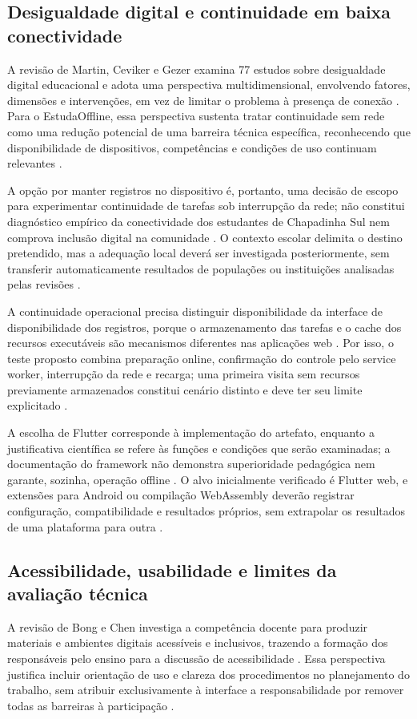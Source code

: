 \subsection{Desigualdade digital e continuidade em baixa conectividade}
A revisão de Martin, Ceviker e Gezer examina 77 estudos sobre desigualdade digital educacional e adota uma perspectiva multidimensional, envolvendo fatores, dimensões e intervenções, em vez de limitar o problema à presença de conexão \citep{martin2024}.
Para o EstudaOffline, essa perspectiva sustenta tratar continuidade sem rede como uma redução potencial de uma barreira técnica específica, reconhecendo que disponibilidade de dispositivos, competências e condições de uso continuam relevantes \citep{martin2024}.

A opção por manter registros no dispositivo é, portanto, uma decisão de escopo para experimentar continuidade de tarefas sob interrupção da rede; não constitui diagnóstico empírico da conectividade dos estudantes de Chapadinha Sul nem comprova inclusão digital na comunidade \citep{martin2024}.
O contexto escolar delimita o destino pretendido, mas a adequação local deverá ser investigada posteriormente, sem transferir automaticamente resultados de populações ou instituições analisadas pelas revisões \citep{martin2024,education_palalas2020}.

A continuidade operacional precisa distinguir disponibilidade da interface de disponibilidade dos registros, porque o armazenamento das tarefas e o cache dos recursos executáveis são mecanismos diferentes nas aplicações web \citep{local,sw}.
Por isso, o teste proposto combina preparação online, confirmação do controle pelo service worker, interrupção da rede e recarga; uma primeira visita sem recursos previamente armazenados constitui cenário distinto e deve ter seu limite explicitado \citep{sw}.

A escolha de Flutter corresponde à implementação do artefato, enquanto a justificativa científica se refere às funções e condições que serão examinadas; a documentação do framework não demonstra superioridade pedagógica nem garante, sozinha, operação offline \citep{flutter,education_palalas2020}.
O alvo inicialmente verificado é Flutter web, e extensões para Android ou compilação WebAssembly deverão registrar configuração, compatibilidade e resultados próprios, sem extrapolar os resultados de uma plataforma para outra \citep{eng04}.

\subsection{Acessibilidade, usabilidade e limites da avaliação técnica}
A revisão de Bong e Chen investiga a competência docente para produzir materiais e ambientes digitais acessíveis e inclusivos, trazendo a formação dos responsáveis pelo ensino para a discussão de acessibilidade \citep{bong2021}.
Essa perspectiva justifica incluir orientação de uso e clareza dos procedimentos no planejamento do trabalho, sem atribuir exclusivamente à interface a responsabilidade por remover todas as barreiras à participação \citep{bong2021}.

